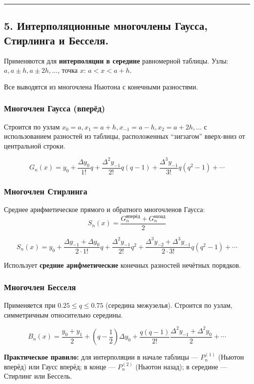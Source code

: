 \documentclass[14pt,a4paper]{extarticle}
\begin{document}
\hrule\bigskip

\subsection{5. Интерполяционные многочлены Гаусса, Стирлинга и Бесселя.}

Применяются для \textbf{интерполяции в середине} равномерной таблицы. Узлы: $a, a \pm h, a \pm 2h, \ldots$, точка $x$: $a < x < a + h$.

Все выводятся из многочлена Ньютона с конечными разностями.

\subsubsection{Многочлен Гаусса (вперёд)}

Строится по узлам $x_0 = a, x_1 = a + h, x_{-1} = a - h, x_2 = a + 2h, \ldots$ с использованием разностей из таблицы, расположенных ``зигзагом'' вверх-вниз от центральной строки.

\[G_n(x) = y_0 + \frac{\Delta y_0}{1!} q + \frac{\Delta^2 y_{-1}}{2!} q(q-1) + \frac{\Delta^3 y_{-1}}{3!} q(q^2 - 1) + \cdots\]

\subsubsection{Многочлен Стирлинга}

Среднее арифметическое прямого и обратного многочленов Гаусса:
\[S_n(x) = \frac{G_n^{\text{вперёд}} + G_n^{\text{назад}}}{2}\]

\[S_n(x) = y_0 + \frac{\Delta y_{-1} + \Delta y_0}{2 \cdot 1!} q + \frac{\Delta^2 y_{-1}}{2!} q^2 + \frac{\Delta^3 y_{-2} + \Delta^3 y_{-1}}{2 \cdot 3!} q(q^2 - 1) + \cdots\]

Использует \textbf{средние арифметические} конечных разностей нечётных порядков.

\subsubsection{Многочлен Бесселя}

Применяется при $0.25 \leq q \leq 0.75$ (середина межузелья). Строится по узлам, симметричным относительно середины.

\[B_n(x) = \frac{y_0 + y_1}{2} + \left(q - \frac{1}{2}\right) \Delta y_0 + \frac{q(q-1)}{2!} \frac{\Delta^2 y_{-1} + \Delta^2 y_0}{2} + \cdots\]

\textbf{Практическое правило:} для интерполяции в начале таблицы --- $P_n^{(1)}$ (Ньютон вперёд) или Гаусс вперёд; в конце --- $P_n^{(2)}$ (Ньютон назад); в середине --- Стирлинг или Бессель.
\end{document}
